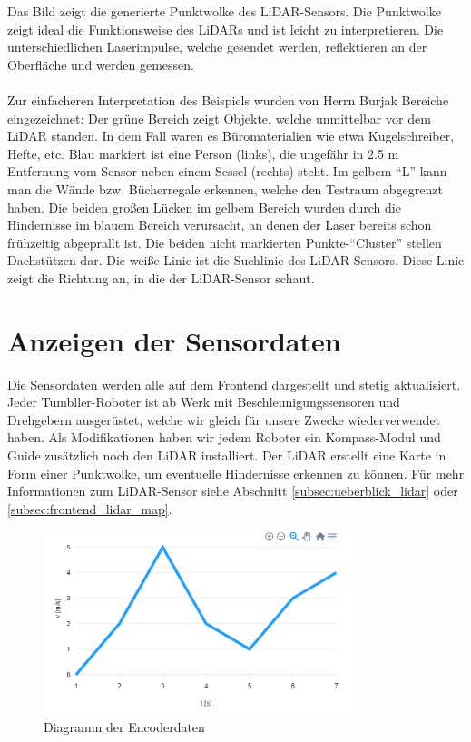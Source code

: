 Das Bild zeigt die generierte Punktwolke des LiDAR-Sensors.
%
Die Punktwolke zeigt ideal die Funktionsweise des LiDARs
und ist leicht zu interpretieren.
%
Die unterschiedlichen Laserimpulse,
welche gesendet werden,
reflektieren an der Oberfläche und werden gemessen.
\\\\
Zur einfacheren Interpretation des Beispiels
wurden von Herrn Burjak Bereiche eingezeichnet:
%
Der grüne Bereich zeigt Objekte,
welche unmittelbar vor dem LiDAR standen.
%
In dem Fall waren es Büromaterialien wie etwa Kugelschreiber, Hefte, etc.
%
Blau markiert ist eine Person (links),
die ungefähr in 2.5 m Entfernung vom Sensor
neben einem Sessel (rechts) steht.
%
Im gelbem ``L'' kann man die Wände bzw. Bücherregale erkennen,
welche den Testraum abgegrenzt haben.
Die beiden großen Lücken im gelbem Bereich wurden
durch die Hindernisse im blauem Bereich verursacht,
an denen der Laser bereits schon frühzeitig abgeprallt ist.
%
Die beiden nicht markierten Punkte-``Cluster'' stellen Dachstützen dar.
%
Die weiße Linie ist die Suchlinie des LiDAR-Sensors. 
Diese Linie zeigt die Richtung an, in die der LiDAR-Sensor schaut.

\section{Anzeigen der Sensordaten}
\label{subsec:frontend_sensors}
Die Sensordaten werden alle auf dem Frontend dargestellt und stetig aktualisiert.
%
Jeder Tumbller-Roboter ist ab Werk mit Beschleunigungssensoren und Drehgebern ausgerüstet,
welche wir gleich für unsere Zwecke wiederverwendet haben.
%
Als Modifikationen haben wir jedem Roboter ein Kompass-Modul
und Guide zusätzlich noch den LiDAR installiert.
%
Der LiDAR erstellt eine Karte in Form einer Punktwolke,
um eventuelle Hindernisse erkennen zu können.
%
Für mehr Informationen zum LiDAR-Sensor siehe Abschnitt \ref{subsec:ueberblick_lidar} oder \ref{subsec:frontend_lidar_map}.

\begin{figure}[H]
    \includegraphics[width=0.8\textwidth, center]{img/encoder_chart.png}
    \caption{Diagramm der Encoderdaten}
    \label{fig:Encoderdaten}
\end{figure}

